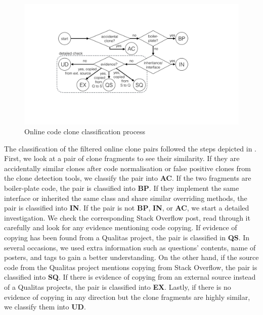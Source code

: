 \documentclass[sigconf,review, anonymous]{acmart}
\begin{document}
\begin{figure}
	\centering
	\includegraphics[width=0.8\linewidth]{classification_process}\vspace{-1ex}
	\caption{Online code clone classification process}
	\label{fig:classification_process}
\end{figure}

The classification of the filtered online clone pairs followed the steps
depicted in . First, we look at a
pair of clone fragments to see their similarity. If they are
accidentally similar clones after code normalisation or false positive
clones from the clone detection tools, we classify the pair into
\textbf{AC}. If the two fragments are boiler-plate code, the pair is
classified into \textbf{BP}. If they implement the same interface or
inherited the same class and share similar overriding methods, the
pair is classified into \textbf{IN}. If the pair is not \textbf{BP},
\textbf{IN}, or \textbf{AC}, we start a detailed investigation. We
check the corresponding Stack Overflow post, read through it carefully
and look for any evidence mentioning code copying. If evidence of
copying has been found from a Qualitas project, the pair is classified
in \textbf{QS}. In several occasions, we used extra information such
as questions' contents, name of posters, and tags to gain a better
understanding. On the other hand, if the source code from the Qualitas
project mentions copying from Stack Overflow, the pair is classified
into \textbf{SQ}. If there is evidence of copying from an external
source instead of a Qualitas projects, the pair is classified into
\textbf{EX}.
Lastly, if there is no evidence of copying in any
direction but the clone fragments are highly similar, we classify them
into \textbf{UD}.
\end{document}
